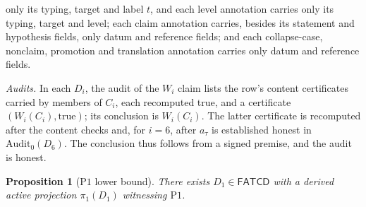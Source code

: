 \documentclass[11pt]{article}
\newtheorem{proposition}[theorem]{Proposition}
\theoremstyle{definition}
\newcommand{\FATCD}{\ensuremath{\mathsf{FATCD}}}
\newcommand{\Pone}{\ensuremath{\mathrm{P1}}}
\begin{document}
only its typing, target and label \(t\), and each level annotation carries only
its typing, target and level; each claim annotation carries, besides its
statement and hypothesis fields, only datum and reference fields; and each
collapse-case, nonclaim, promotion and translation annotation carries only
datum and reference fields. \par\emph{Audits.} In each \(D_i\), the audit of the \(W_i\) claim
lists the row's content certificates carried by members of \(C_i\), each
recomputed true, and a certificate \((W_i(C_i),\mathrm{true})\); its conclusion
is \(W_i(C_i)\). The latter certificate is recomputed after the content checks
and, for \(i=6\), after \(a_\tau\) is established honest in
\(\mathrm{Audit}_0(D_6)\). The conclusion thus follows from a signed premise,
and the audit is honest.

\begin{proposition}[\Pone{} lower bound]\label{prop:p1-witness}
There exists \(D_1 \in \FATCD{}\) with a derived active projection
\(\pi_1(D_1)\) witnessing \Pone{}.
\end{proposition}
\end{document}
